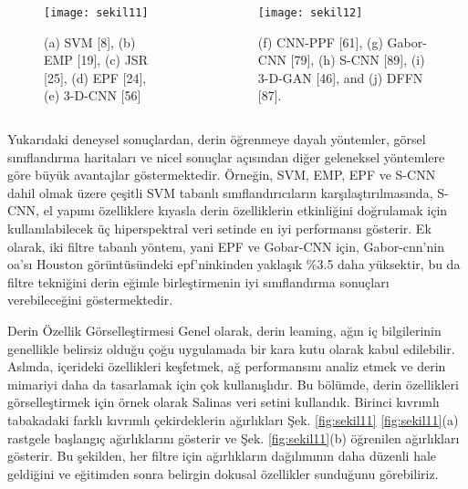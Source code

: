 \documentclass{beamer}
\begin{document}
\begin{frame}
  \begin{columns}
    \begin{column}{0.3\textwidth}
      \begin{figure}
        \texttt{[image: sekil11]}
        \label{fig:sekil7}
        \caption{(a) SVM [8], (b) EMP [19], (c) JSR [25], (d) EPF [24], (e) 3-D-CNN [56]}
      \end{figure}
    \end{column}
    \begin{column}{0.5\textwidth}
      \begin{figure}
        \texttt{[image: sekil12]}
        \label{fig:sekil8} 
        \caption{(f) CNN-PPF [61], (g) Gabor-CNN [79], (h) S-CNN [89], (i) 3-D-GAN [46], and (j) DFFN [87].}
      \end{figure}
    \end{column}
  \end{columns}
\end{frame}

\begin{frame}
Yukarıdaki deneysel sonuçlardan, derin öğrenmeye dayalı yöntemler, görsel sınıflandırma haritaları ve nicel sonuçlar açısından diğer geleneksel yöntemlere göre büyük avantajlar göstermektedir. Örneğin, SVM, EMP, EPF ve S-CNN dahil olmak üzere çeşitli SVM tabanlı sınıflandırıcıların karşılaştırılmasında, S-CNN, el yapımı özelliklere kıyasla derin özelliklerin etkinliğini doğrulamak için kullanılabilecek üç hiperspektral veri setinde en iyi performansı gösterir. Ek olarak, iki filtre tabanlı yöntem, yani EPF ve Gobar-CNN için, Gabor-cnn'nin oa'sı Houston görüntüsündeki epf'ninkinden yaklaşık \%3.5 daha yüksektir, bu da filtre tekniğini derin eğimle birleştirmenin iyi sınıflandırma sonuçları verebileceğini göstermektedir.
\end{frame}

\begin{frame}{Derin Özellik Görselleştirmesi}
  Genel olarak, derin leaming, ağın iç bilgilerinin genellikle belirsiz olduğu çoğu uygulamada bir kara kutu olarak kabul edilebilir. Aslında, içerideki özellikleri keşfetmek, ağ performansını analiz etmek ve derin mimariyi daha da tasarlamak için çok kullanışlıdır. Bu bölümde, derin özellikleri görselleştirmek için örnek olarak Salinas veri setini kullandık. Birinci kıvrımlı tabakadaki farklı kıvrımlı çekirdeklerin ağırlıkları Şek. \ref{fig:sekil11} \ref{fig:sekil11}(a) rastgele başlangıç ağırlıklarını gösterir ve Şek. \ref{fig:sekil11}(b) öğrenilen ağırlıkları gösterir. Bu şekilden, her filtre için ağırlıkların dağılımının daha düzenli hale geldiğini ve eğitimden sonra belirgin dokusal özellikler sunduğunu görebiliriz.
\end{frame}
\end{document}
